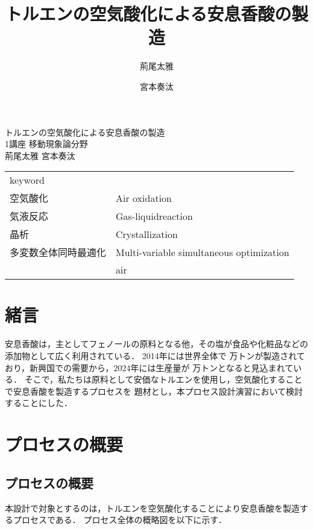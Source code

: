 \documentclass[a4j]{jsreport}
\title{トルエンの空気酸化による安息香酸の製造}
\author{荊尾太雅 \and 宮本奏汰}
\begin{document}
\begin{titlepage}
\vspace{5cm}
\centering
{\Huge トルエンの空気酸化による安息香酸の製造}\\
\vspace{2cm}
\centering
{\Large 1講座 移動現象論分野}\\
\vspace{0.5cm}
\centering
{\large 荊尾太雅  宮本奏汰}\\
\vspace{3cm}
\begin{table}[htbp]
    \begin{center}
        \begin{tabular}[htbp]{ll}
            \multicolumn{2}{l}{{\LARGE keyword}}\\
            {\Large 空気酸化}&{\Large Air oxidation}\\
            {\Large 気液反応}&{\Large Gas-liquidreaction}\\
            {\Large 晶析}&{\Large Crystallization}\\
            {\Large 多変数全体同時最適化}&{\Large Multi-variable simultaneous optimization}\\
            {\Large }&{\Large air}\\
        \end{tabular}
    \end{center}
\end{table}
\end{titlepage}

\setcounter{tocdepth}{2}
\tableofcontents


\chapter{緒言}
安息香酸は，主としてフェノールの原料となる他，その塩が食品や化粧品などの添加物として広く利用されている．
2014年には世界全体で 万トンが製造されており，新興国での需要から，2024年には生産量が 万トンとなると見込まれている．
そこで，私たちは原料として安価なトルエンを使用し，空気酸化することで安息香酸を製造するプロセスを
題材とし，本プロセス設計演習において検討することにした．

\newpage
\chapter{プロセスの概要}
\section{プロセスの概要}
本設計で対象とするのは，トルエンを空気酸化することにより安息香酸を製造するプロセスである．
プロセス全体の概略図を以下に示す．
\end{document}
